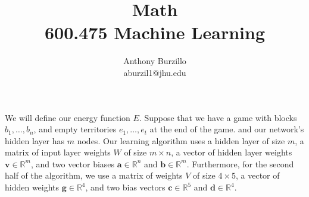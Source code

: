 \documentclass{amsart}
\title{Math\\600.475 Machine Learning}
\author{Anthony Burzillo\\aburzil1@jhu.edu}
\def\v#1{\mathbf{#1}}
\begin{document}
\maketitle

\def\touches#1#2{\mbox{touches}_{#1}{\left(#2\right)}}
\def\color#1{\mbox{color}{\left(#1\right)}}
\def\colorp#1{\mbox{color}^*{\left(#1\right)}}
\def\size#1{\mbox{size}{\left(#1\right)}}

We will define our energy function $E$. Suppose that we have a game with blocks $b_1, \ldots, b_n$, and empty territories
$e_1, \ldots, e_t$ at the end of the game.  and our network's hidden layer has $m$ nodes. Our learning algorithm uses a
hidden layer of size $m$, a matrix of input layer weights $W$ of size $m \times n$, a vector of hidden layer weights
$\v{ v } \in \mathbb{ R }^m$, and two vector biases $\v{ a } \in \mathbb{ R }^n$ and $\v{ b } \in \mathbb{ R }^m$.
Furthermore, for the second half of the algorithm, we use a matrix of weights $V$ of size $4 \times 5$, a vector of hidden
weights $\v{ g } \in \mathbb{ R }^4$, and two bias vectors $\v{ c } \in \mathbb{ R }^5$ and $\v{ d } \in \mathbb{ R }^4$.
\end{document}
